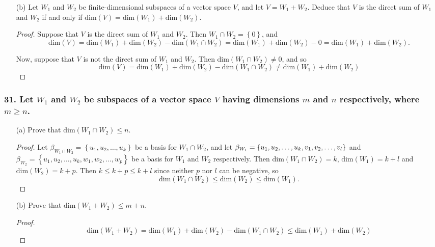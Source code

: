 \documentclass{article}
\begin{document}
\begin{enumerate}
	\item[(b)] Let $W_1$ and $W_2$ be finite-dimensional subspaces of a vector space $V$, and let $V = W_1 + W_2$. Deduce that $V$ is the direct sum of $W_1$ and $W_2$ if and only if $\text{dim}(V) = \text{dim}(W_1) + \text{dim}(W_2)$.
	
	\begin{proof}
		Suppose that $V$ is the direct sum of $W_1$ and $W_2$. Then $W_1 \cap W_2 = \left\{0\right\}$, and \[\text{dim}(V) = \text{dim}(W_1) + \text{dim}(W_2) - \text{dim}(W_1 \cap W_2) = \text{dim}(W_1) + \text{dim}(W_2) - 0 = \text{dim}(W_1) + \text{dim}(W_2).\]

		Now, suppose that $V$ is not the direct sum of $W_1$ and $W_2$. Then $\text{dim}(W_1 \cap W_2) \ne 0$, and so 
		\[\text{dim}(V) = \text{dim}(W_1) + \text{dim}(W_2) - \text{dim}(W_1 \cap W_2) \ne \text{dim}(W_1) + \text{dim}(W_2) \]
	\end{proof}
\end{enumerate}

\subsubsection*{31. Let $W_1$ and $W_2$ be subspaces of a vector space $V$ having dimensions $m$ and $n$ respectively, where $m \ge n$.}
\begin{enumerate}
	\item[(a)] Prove that $\text{dim}(W_1\cap W_2) \le n$.
	
	\begin{proof}
		Let $\beta_{W_1\cap W_2} = \left\{u_1, u_2, \dots, u_k\right\}$ be a basis for $W_1 \cap W_2$, and let $\\\beta_{W_1} = \left\{u_1, u_2, \dots, u_k, v_1, v_2, \dots, v_l\right\}$ and $\beta_{W_2} = \left\{u_1, u_2, \dots, u_k, w_1, w_2, \dots, w_p\right\}$ be a basis for $W_1$ and $W_2$ respectively. Then $\text{dim}(W_1 \cap W_2) = k$, $\text{dim}(W_1) = k + l$ and $\text{dim}(W_2) = k + p$. Then $k \le k + p \le k + l$ since neither $p$ nor $l$ can be negative, so \[\text{dim}(W_1 \cap W_2) \le \text{dim}(W_2) \le \text{dim}(W_1).\]
	\end{proof}

	\item[(b)] Prove that $\text{dim}(W_1 + W_2) \le m + n$.
	
	\begin{proof}
		\[\text{dim}(W_1 + W_2) = \text{dim}(W_1) + \text{dim}(W_2) - \text{dim}(W_1 \cap W_2) \le \text{dim}(W_1) + \text{dim}(W_2)\]
	\end{proof}
\end{enumerate}
\end{document}
